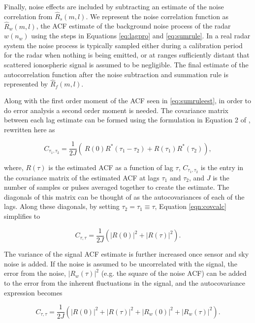 Finally, noise effects are included by subtracting an estimate of the noise correlation from $\widehat{R}_s(m,l)$.  We represent the noise correlation function as $\widehat{R}_w(m,l)$, the ACF estimate of the background noise process of the radar $w(n_w)$ using the steps in Equations \ref{eq:lagpro} and \ref{eq:sumrule}. In a real radar system the noise process is typically sampled either during a calibration period for the radar when nothing is being emitted, or at ranges sufficiently distant that scattered ionospheric signal is assumed to be negligible. The final estimate of the autocorrelation function after the noise subtraction and summation rule is represented by $\widehat{R}_f(m,l)$.

Along with the first order moment of the ACF seen in \ref{eq:sumruleest}, in order to do error analysis a second order moment is needed. The covariance matrix between each lag estimate can be formed using the formulation in Equation 2 of \cite{hysell2008}, rewritten here as

\begin{equation}
\label{eqn:covcalc}
C_{\tau_1,\tau_2} = \frac{1}{2J} \left( \ R(0)  R^*(\tau_1-\tau_2) +  R(\tau_1) R^*(\tau_2) \right),
\end{equation}

\noindent where, $R(\tau)$ is the estimated ACF as a function of lag $\tau$, $C_{\tau_1,\tau_2}$ is the entry in the covariance matrix of the estimated ACF at lags $\tau_1$ and $\tau_2$,  and $J$ is the number of samples or pulses averaged together to create the estimate. The diagonals of this matrix can be thought of as the autocovariances of each of the lags.  Along these diagonals, by setting $\tau_2 = \tau_1 \equiv \tau$, Equation \ref{eqn:covcalc} simplifies to

\begin{equation}
\label{eqn:covdiag}
C_{\tau,\tau} = \frac{1}{2J} \left(  |R(0)|^2 +|R(\tau)|^2\right).
\end{equation}

The variance of the signal ACF estimate is further increased once sensor and sky noise is added.  If the noise is assumed to be uncorrelated with the signal, the error from the noise, $\left|R_w (\tau)\right|^2$ (e.g. the square of the noise ACF) can be added to the error from the inherent fluctuations in the signal, and the autocovariance expression becomes

\begin{equation}
\label{eqn:covdiagwn}
C_{\tau,\tau} = \frac{1}{2J} \left(  |R(0)|^2 +|R(\tau)|^2 + \left|R_w (0)\right|^2+\left|R_w (\tau)\right|^2\right).
\end{equation}


